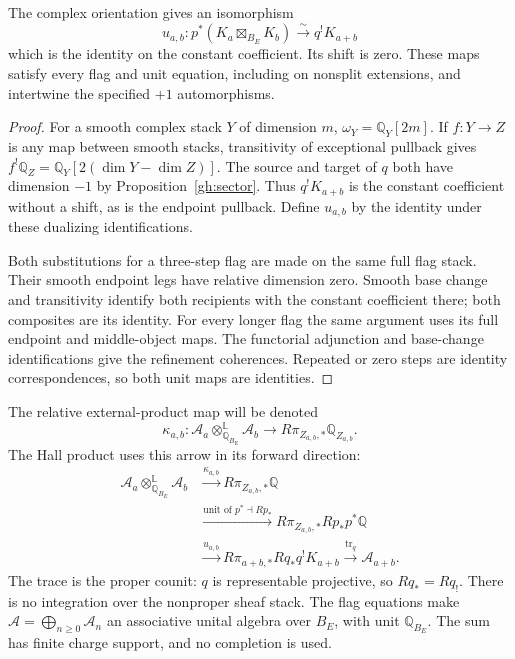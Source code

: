 \begin{proposition}\label{gh:coefficient-maps}
The complex orientation gives an isomorphism
\[
 u_{a,b}:p^*(K_a\boxtimes_{B_E}K_b)
                  \xrightarrow{\ \sim\ }q^!K_{a+b}
\]
which is the identity on the constant coefficient. Its shift is zero.
These maps satisfy every flag and unit equation, including on nonsplit
extensions, and intertwine the specified $+1$ automorphisms.
\end{proposition}
\begin{proof}
For a smooth complex stack $Y$ of dimension $m$,
$\omega_Y=\mathbb Q_Y[2m]$.
If $f:Y\to Z$ is any map between smooth stacks, transitivity of
exceptional pullback gives
$f^!\mathbb Q_Z=\mathbb Q_Y[2(\dim Y-\dim Z)]$.
The source and target of $q$ both have dimension $-1$ by
Proposition~\ref{gh:sector}. Thus $q^!K_{a+b}$ is the constant
coefficient without a shift, as is the endpoint pullback. Define
$u_{a,b}$ by the identity under these dualizing identifications.

Both substitutions for a three-step flag are made on the same full
flag stack. Their smooth endpoint legs have relative dimension zero.
Smooth base change and transitivity identify both recipients with the
constant coefficient there; both composites are its identity.
For every longer flag the same argument uses its full endpoint and
middle-object maps. The functorial adjunction and base-change
identifications give the refinement coherences. Repeated or zero
steps are identity correspondences, so both unit maps are identities.
\end{proof}

The relative external-product map will be denoted
\[
 \kappa_{a,b}:\mathcal A_a\otimes_{\mathbb Q_{B_E}}^{\mathbb L}
                  \mathcal A_b
       \longrightarrow R\pi_{Z_{a,b},*}\mathbb Q_{Z_{a,b}}.
\]
The Hall product uses this arrow in its forward direction:
\begin{equation}\label{gh:hall-product}
 \begin{split}
 \mathcal A_a\otimes^{\mathbb L}_{\mathbb Q_{B_E}}\mathcal A_b
 &\xrightarrow{\kappa_{a,b}}
                  R\pi_{Z_{a,b},*}\mathbb Q\\
 &\xrightarrow{\text{unit of }p^*\dashv Rp_*}
                  R\pi_{Z_{a,b},*}Rp_*p^*\mathbb Q\\
 &\xrightarrow{u_{a,b}}
                  R\pi_{a+b,*}Rq_*q^!K_{a+b}
 \xrightarrow{\operatorname{tr}_q}\mathcal A_{a+b}.
 \end{split}
\end{equation}
The trace is the proper counit: $q$ is representable projective, so
$Rq_*=Rq_!$. There is no integration over the nonproper sheaf stack.
The flag equations make
$\mathcal A=\bigoplus_{n\geq0}\mathcal A_n$ an associative unital
algebra over $B_E$, with unit $\mathbb Q_{B_E}$. The sum has finite
charge support, and no completion is used.

